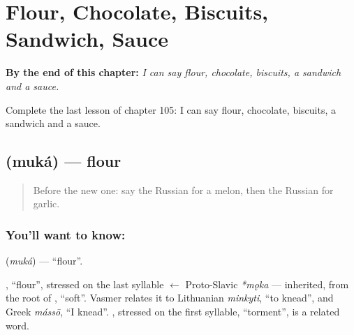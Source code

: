 
\chapter{Flour, Chocolate, Biscuits, Sandwich, Sauce}
\label{ch:ru-flour-chocolate-biscuits-sandwich-sauce}

\begin{chapteropening}
\textbf{By the end of this chapter:} \emph{I can say flour, chocolate, biscuits, a sandwich and a sauce.}

Complete the last lesson of chapter 105: I can say flour, chocolate, biscuits, a sandwich and a sauce.
\end{chapteropening}

\section[\texorpdfstring{\ru{мука} (muká)}{мука (muká)}]{ (muká) — flour}

\label{lesson:RU-C105-flour}



\begin{quote}
Before the new one: say the Russian for a melon, then the Russian for garlic.
\end{quote}

\subsection*{You'll want to know: }
\textbf{} (\emph{muká}) — \textquotedblleft{}flour\textquotedblright{}.

\begin{cousinweb}
\textbf{}, \textquotedblleft{}flour\textquotedblright{}, stressed on the last syllable $\leftarrow$ Proto-Slavic \emph{*mǫka} — inherited, from the root of \emph{}, \textquotedblleft{}soft\textquotedblright{}. Vasmer relates it to Lithuanian \emph{minkyti}, \textquotedblleft{}to knead\textquotedblright{}, and Greek \emph{mássō}, \textquotedblleft{}I knead\textquotedblright{}. \emph{}, stressed on the first syllable, \textquotedblleft{}torment\textquotedblright{}, is a related word.
\end{cousinweb}

